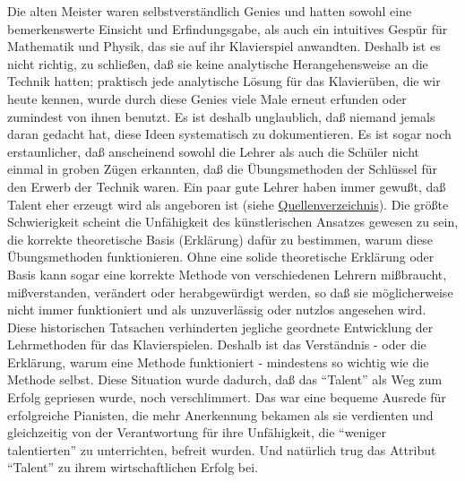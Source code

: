 Die alten Meister waren selbstverständlich Genies und hatten sowohl eine bemerkenswerte Einsicht und Erfindungsgabe, als auch ein intuitives Gespür für Mathematik und Physik, das sie auf ihr Klavierspiel anwandten.
Deshalb ist es nicht richtig, zu schließen, daß sie keine analytische Herangehensweise an die Technik hatten; praktisch jede analytische Lösung für das Klavierüben, die wir heute kennen, wurde durch diese Genies viele Male erneut erfunden oder zumindest von ihnen benutzt.
Es ist deshalb unglaublich, daß niemand jemals daran gedacht hat, diese Ideen systematisch zu dokumentieren.
Es ist sogar noch erstaunlicher, daß anscheinend sowohl die Lehrer als auch die Schüler nicht einmal in groben Zügen erkannten, daß die Übungsmethoden der Schlüssel für den Erwerb der Technik waren.
Ein paar gute Lehrer haben immer gewußt, daß Talent eher erzeugt wird als angeboren ist (siehe \hyperlink{reference}{Quellenverzeichnis}).
Die größte Schwierigkeit scheint die Unfähigkeit des künstlerischen Ansatzes gewesen zu sein, die korrekte theoretische Basis (Erklärung) dafür zu bestimmen, warum diese Übungsmethoden funktionieren.
Ohne eine solide theoretische Erklärung oder Basis kann sogar eine korrekte Methode von verschiedenen Lehrern mißbraucht, mißverstanden, verändert oder herabgewürdigt werden, so daß sie möglicherweise nicht immer funktioniert und als unzuverlässig oder nutzlos angesehen wird.
Diese historischen Tatsachen verhinderten jegliche geordnete Entwicklung der Lehrmethoden für das Klavierspielen.
Deshalb ist das Verständnis - oder die Erklärung, warum eine Methode funktioniert - mindestens so wichtig wie die Methode selbst.
Diese Situation wurde dadurch, daß das \enquote{Talent} als Weg zum Erfolg gepriesen wurde, noch verschlimmert.
Das war eine bequeme Ausrede für erfolgreiche Pianisten, die mehr Anerkennung bekamen als sie verdienten und gleichzeitig von der Verantwortung für ihre Unfähigkeit, die \enquote{weniger talentierten} zu unterrichten, befreit wurden.
Und natürlich trug das Attribut \enquote{Talent} zu ihrem wirtschaftlichen Erfolg bei.

